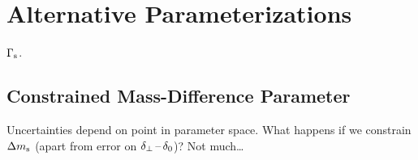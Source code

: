 \section{Alternative Parameterizations}
\label{sec:result_altParam}

$\Gamma_\text{s}$\unitsp\invps.

\subsection{Constrained Mass-Difference Parameter}
\label{subsec:result_altParam_Delm}

Uncertainties depend on point in parameter space. What happens if we constrain $\Delta m_\text{s}$ (apart from error on $\delta_{\perp}\,\text{--}\,\delta_{0}$)? Not much\ldots
